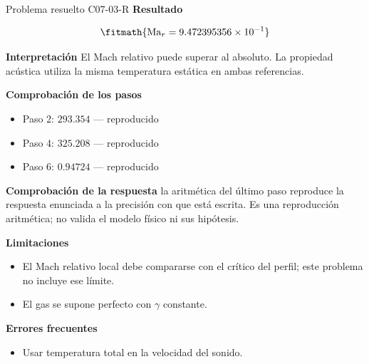 \documentclass[10pt,openany]{book}
\begin{document}
\begin{studiumworked}{Problema resuelto C07-03-R}
\noindent\textbf{Resultado}

\[
\fitmath{\mathrm{Ma}_r=9.472395356\times10^{-1}}
\]

\noindent\textbf{Interpretación}
El Mach relativo puede superar al absoluto. La propiedad acústica utiliza la misma temperatura estática en ambas referencias.

\noindent\textbf{Comprobación de los pasos}
\begin{itemize}
\item Paso 2: $293.354$ — reproducido
\item Paso 4: $325.208$ — reproducido
\item Paso 6: $0.94724$ — reproducido
\end{itemize}

\noindent\textbf{Comprobación de la respuesta} la aritmética del último paso reproduce la respuesta enunciada a la precisión con que está escrita. Es una reproducción aritmética; no valida el modelo físico ni sus hipótesis.

\noindent\textbf{Limitaciones}
\begin{itemize}
\item El Mach relativo local debe compararse con el crítico del perfil; este problema no incluye ese límite.
\item El gas se supone perfecto con $\gamma$ constante.
\end{itemize}

\noindent\textbf{Errores frecuentes}
\begin{itemize}
\item Usar temperatura total en la velocidad del sonido.
\end{itemize}
\end{studiumworked}
\end{document}
